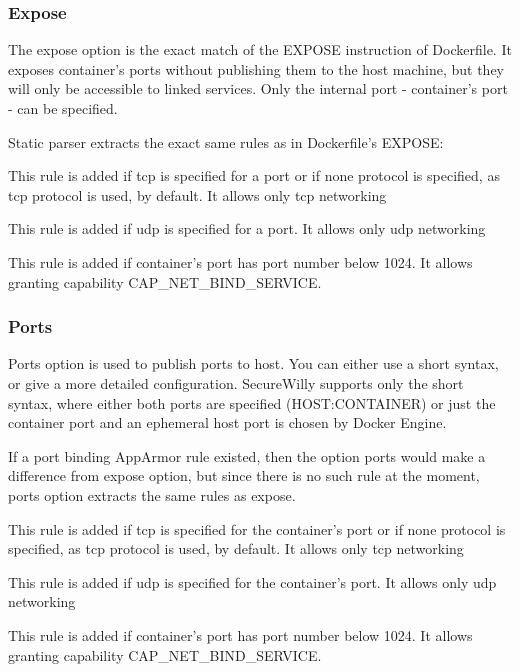 \subsubsection{Expose}

The expose option is the exact match of the EXPOSE instruction of Dockerfile. It exposes container's ports without publishing them to the host machine, but they will only be accessible to linked services. Only the internal port - container's port - can be specified.

Static parser extracts the exact same rules as in Dockerfile's EXPOSE:
\begin{description}[style=nextline]
\item[network tcp]
This rule is added if tcp is specified for a port or if none protocol is specified, as tcp protocol is used, by default. It allows only tcp networking
\item[network udp]
This rule is added if udp is specified for a port. It allows only udp networking
\item[capability net\_bind\_service]
This rule is added if container's port has port number below 1024. It allows granting capability CAP\_NET\_BIND\_SERVICE.
\end{description}

\subsubsection{Ports}

Ports option is used to publish ports to host. You can either use a short syntax, or give a more detailed configuration. SecureWilly supports only the short syntax, where either both ports are specified (HOST:CONTAINER) or just the container port and an ephemeral host port is chosen by Docker Engine.

If a port binding AppArmor rule existed, then the option ports would make a difference from expose option, but since there is no such rule at the moment, ports option extracts the same rules as expose.

\begin{description}[style=nextline]
\item[network tcp]
This rule is added if tcp is specified for the container's port or if none protocol is specified, as tcp protocol is used, by default. It allows only tcp networking
\item[network udp]
This rule is added if udp is specified for the container's port. It allows only udp networking
\item[capability net\_bind\_service]
This rule is added if container's port has port number below 1024. It allows granting capability CAP\_NET\_BIND\_SERVICE.
\end{description}

